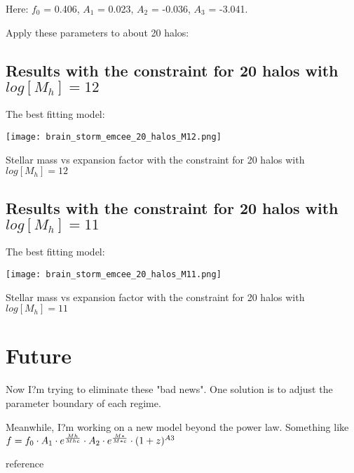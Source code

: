 \documentclass[ajp]{article}   	%
\begin{document}
Here: $f_0$ = 0.406, $A_1$ = 0.023, $A_2$ = -0.036, $A_3$ = -3.041.





Apply these parameters to about 20 halos:

\subsection{Results with the constraint for 20 halos with $log[M_h]=12$}
The best fitting model:

\begin{center}
\texttt{[image: brain\_storm\_emcee\_20\_halos\_M12.png]}

\centerline{Stellar mass vs expansion factor with the constraint for 20 halos with $log[M_h]=12$}

\end{center}


\subsection{Results with the constraint for 20 halos with $log[M_h]=11$}
The best fitting model:

\begin{center}
\texttt{[image: brain\_storm\_emcee\_20\_halos\_M11.png]}

\centerline{Stellar mass vs expansion factor with the constraint for 20 halos with $log[M_h]=11$}

\end{center}

\section{Future}
\bigskip
Now I?m trying to eliminate these "bad news". One solution is to adjust the parameter boundary of each regime.

\bigskip
Meanwhile, I?m working on a new model beyond the power law. Something like $f=f_0 \cdot A_1 \cdot e^{{Mh}\over{Mhc}}\cdot A_2 \cdot e^{{M*}\over{M*c}} \cdot (1+z)^{A3}$ \cite{behroozi2013average}
\bigskip



reference
 
\end{document}
